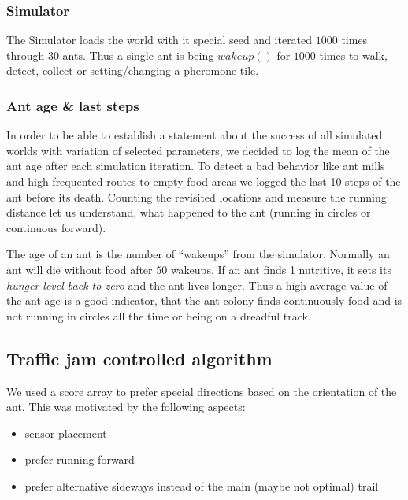 \subsubsection{Simulator}\label{simulator}

The Simulator loads the world with it special seed and iterated \(1000\)
times through \(30\) ants. Thus a single ant is being \(wakeup()\) for
\(1000\) times to walk, detect, collect or setting/changing a pheromone
tile.

\subsubsection{Ant age \& last steps}\label{ant-age-last-steps}

In order to be able to establish a statement about the success of all
simulated worlds with variation of selected parameters, we decided to
log the mean of the ant age after each simulation iteration. To detect a
bad behavior like ant mills and high frequented routes to empty food
areas we logged the last 10 steps of the ant before its death. Counting
the revisited locations and measure the running distance let us
understand, what happened to the ant (running in circles or continuous
forward).

The age of an ant is the number of ``wakeups'' from the simulator.
Normally an ant will die without food after \(50\) wakeups. If an ant
finds 1 nutritive, it sets its \emph{hunger level back to zero} and the
ant lives longer. Thus a high average value of the ant age is a good
indicator, that the ant colony finds continuously food and is not
running in circles all the time or being on a dreadful track.

\subsection{Traffic jam controlled
algorithm}\label{traffic-jam-controlled-algorithm}

We used a score array to prefer special directions based on the
orientation of the ant. This was motivated by the following aspects:

\begin{itemize}
\tightlist
\item
  sensor placement
\item
  prefer running forward
\item
  prefer alternative sideways instead of the main (maybe not optimal)
  trail
\end{itemize}

